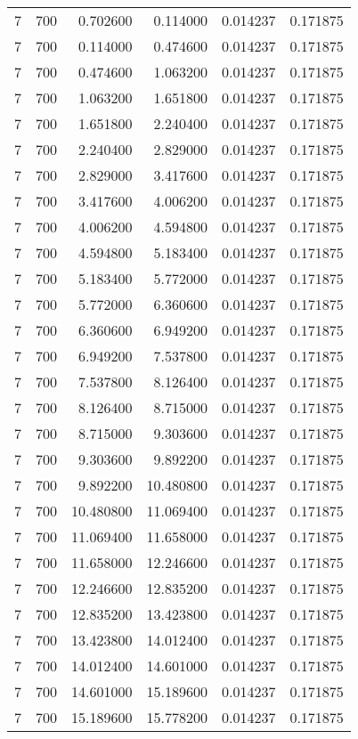 \begin{longtable}{rrrrrr}
7 & 700 & 0.702600 & 0.114000 & 0.014237 & 0.171875 \\
7 & 700 & 0.114000 & 0.474600 & 0.014237 & 0.171875 \\
7 & 700 & 0.474600 & 1.063200 & 0.014237 & 0.171875 \\
7 & 700 & 1.063200 & 1.651800 & 0.014237 & 0.171875 \\
7 & 700 & 1.651800 & 2.240400 & 0.014237 & 0.171875 \\
7 & 700 & 2.240400 & 2.829000 & 0.014237 & 0.171875 \\
7 & 700 & 2.829000 & 3.417600 & 0.014237 & 0.171875 \\
7 & 700 & 3.417600 & 4.006200 & 0.014237 & 0.171875 \\
7 & 700 & 4.006200 & 4.594800 & 0.014237 & 0.171875 \\
7 & 700 & 4.594800 & 5.183400 & 0.014237 & 0.171875 \\
7 & 700 & 5.183400 & 5.772000 & 0.014237 & 0.171875 \\
7 & 700 & 5.772000 & 6.360600 & 0.014237 & 0.171875 \\
7 & 700 & 6.360600 & 6.949200 & 0.014237 & 0.171875 \\
7 & 700 & 6.949200 & 7.537800 & 0.014237 & 0.171875 \\
7 & 700 & 7.537800 & 8.126400 & 0.014237 & 0.171875 \\
7 & 700 & 8.126400 & 8.715000 & 0.014237 & 0.171875 \\
7 & 700 & 8.715000 & 9.303600 & 0.014237 & 0.171875 \\
7 & 700 & 9.303600 & 9.892200 & 0.014237 & 0.171875 \\
7 & 700 & 9.892200 & 10.480800 & 0.014237 & 0.171875 \\
7 & 700 & 10.480800 & 11.069400 & 0.014237 & 0.171875 \\
7 & 700 & 11.069400 & 11.658000 & 0.014237 & 0.171875 \\
7 & 700 & 11.658000 & 12.246600 & 0.014237 & 0.171875 \\
7 & 700 & 12.246600 & 12.835200 & 0.014237 & 0.171875 \\
7 & 700 & 12.835200 & 13.423800 & 0.014237 & 0.171875 \\
7 & 700 & 13.423800 & 14.012400 & 0.014237 & 0.171875 \\
7 & 700 & 14.012400 & 14.601000 & 0.014237 & 0.171875 \\
7 & 700 & 14.601000 & 15.189600 & 0.014237 & 0.171875 \\
7 & 700 & 15.189600 & 15.778200 & 0.014237 & 0.171875 \\

\end{longtable}
